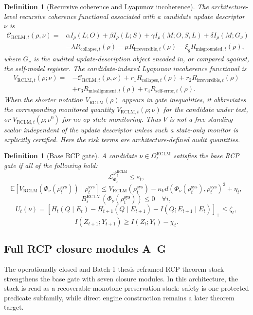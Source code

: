 \documentclass[11pt,a4paper]{article}
\newtheorem{definition}[theorem]{Definition}
\newcommand{\Ccal}{\mathcal C}
\newcommand{\Lcal}{\mathcal L}
\newcommand{\Pcal}{\mathcal P}
\newcommand{\eps}{\varepsilon}
\newcommand{\RCLM}{\mathrm{RCLM}}
\newcommand{\sys}{\mathrm{sys}}
\newcommand{\collapse}{\mathrm{collapse}}
\newcommand{\irreversible}{\mathrm{irreversible}}
\newcommand{\misgrounded}{\mathrm{misgrounded}}
\newcommand{\misalignment}{\mathrm{misalignment}}
\newcommand{\selferror}{\mathrm{self\mbox{-}error}}
\begin{document}
\begin{definition}[Recursive coherence and Lyapunov incoherence]
The architecture-level recursive coherence functional associated with a candidate update descriptor \(\nu\) is
\[
\begin{aligned}
\Ccal_{\RCLM,t}(\rho,\nu)
={}&
\alpha I_\rho(L;O)+\beta I_\rho(L;S)
+\gamma I_\rho(M;O,S,L)+\delta I_\rho(M;G_\nu)\\
&-\lambda R_{\collapse,t}(\rho)
-\mu R_{\irreversible,t}(\rho)
-\xi_g R_{\misgrounded,t}(\rho),
\end{aligned}
\]
where \(G_\nu\) is the audited update-description object encoded in, or compared against, the self-model register.  The candidate-indexed Lyapunov incoherence functional is
\[
\begin{aligned}
V_{\RCLM,t}(\rho;\nu)
={}&-\Ccal_{\RCLM,t}(\rho,\nu)
+r_1R_{\collapse,t}(\rho)
+r_2R_{\irreversible,t}(\rho)\\
&+r_3R_{\misalignment,t}(\rho)
+r_4R_{\selferror,t}(\rho).
\end{aligned}
\]
When the shorter notation \(V_{\RCLM}(\rho)\) appears in gate inequalities, it abbreviates the corresponding monitored quantity \(V_{\RCLM,t}(\rho;\nu)\) for the candidate under test, or \(V_{\RCLM,t}(\rho;\nu^0)\) for no-op state monitoring.  Thus \(V\) is not a free-standing scalar independent of the update descriptor unless such a state-only monitor is explicitly certified.
Here the risk terms are architecture-defined audit quantities.
\end{definition}

\begin{definition}[Base RCP gate]
A candidate \(\nu\in\Omega_t^{\RCLM}\) satisfies the base RCP gate if all of the following hold:
\[
\Lcal^{\Pcal_t^{\RCLM}}_{\Phi_\nu}\le \eps_t,
\]
\[
\mathbb E[V_{\RCLM}(\Phi_\nu(\rho_t^{\sys}))\mid\rho_t^{\sys}]
\le
V_{\RCLM}(\rho_t^{\sys})-\kappa_V d(\Phi_\nu(\rho_t^{\sys}),\rho_t^{\sys})^2+\eta_t,
\]
\[
B_i^{\RCLM}(\Phi_\nu(\rho_t^{\sys}))\le0\quad\forall i,
\]
\[
U_t(\nu)=
\left[H_t(Q\mid E_t)-H_{t+1}(Q\mid E_{t+1})-I(Q;E_{t+1}\mid E_t)\right]_+
\le\zeta_t,
\]
\[
I(Z_{t+1};Y_{t+1})\ge I(Z_t;Y_t)-\chi_t.
\]
\end{definition}

\subsection{Full RCP closure modules A--G}

The operationally closed and Batch-1 thesis-reframed RCP theorem stack strengthens the base gate with seven closure modules. In this architecture, the stack is read as a recoverable-monotone preservation stack: safety is one protected predicate subfamily, while direct engine construction remains a later theorem target.
\end{document}
